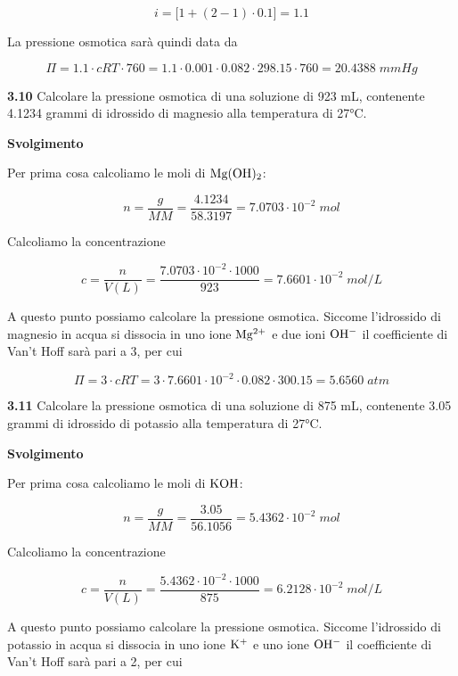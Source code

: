 $$i=\big[1 + (2-1) \cdot 0.1\big]=1.1$$

La pressione osmotica sarà quindi data da

$$\Pi=1.1 \cdot cRT \cdot 760
=1.1 \cdot 0.001 \cdot 0.082 \cdot 298.15 \cdot 760=20.4388\;mmHg$$

\vspace{0.2cm}\textbf{3.10} Calcolare la pressione osmotica di una soluzione di 923 mL, contenente 4.1234 grammi di idrossido di magnesio alla temperatura di 27°C. 

\vspace{0.2cm}\large\textbf{Svolgimento}\normalsize

\vspace{0.2cm}Per prima cosa calcoliamo le moli di $\rm Mg(OH)_2$:

$$n=\frac{g}{MM}=\frac{4.1234}{58.3197}=7.0703 \cdot 10^{-2}\;mol$$

Calcoliamo la concentrazione

$$c=\frac{n}{V(L)}=\frac{7.0703 \cdot 10^{-2} \cdot 1000}{923}=7.6601 \cdot 10^{-2}\;mol/L$$

A questo punto possiamo calcolare la pressione osmotica. Siccome l'idrossido di magnesio in acqua si dissocia in uno ione $\rm Mg^{2+}$ e due ioni $\rm OH^-$ il coefficiente di Van't Hoff sarà pari a 3, per cui

$$\Pi=3 \cdot cRT
=3 \cdot 7.6601 \cdot 10^{-2} \cdot 0.082 \cdot 300.15
=5.6560\;atm$$

\vspace{0.2cm}\textbf{3.11} Calcolare la pressione osmotica di una soluzione di 875 mL, contenente 3.05 grammi di idrossido
di potassio alla temperatura di 27°C.

\vspace{0.2cm}\large\textbf{Svolgimento}\normalsize

\vspace{0.2cm}Per prima cosa calcoliamo le moli di $\rm KOH$:

$$n=\frac{g}{MM}=\frac{3.05}{56.1056}=5.4362 \cdot 10^{-2}\;mol$$

Calcoliamo la concentrazione

$$c=\frac{n}{V(L)}=\frac{5.4362 \cdot 10^{-2} \cdot 1000}{875}=6.2128 \cdot 10^{-2}\;mol/L$$

A questo punto possiamo calcolare la pressione osmotica. Siccome l'idrossido di potassio in acqua si dissocia in uno ione $\rm K^{+}$ e uno ione $\rm OH^-$ il coefficiente di Van't Hoff sarà pari a 2, per cui

